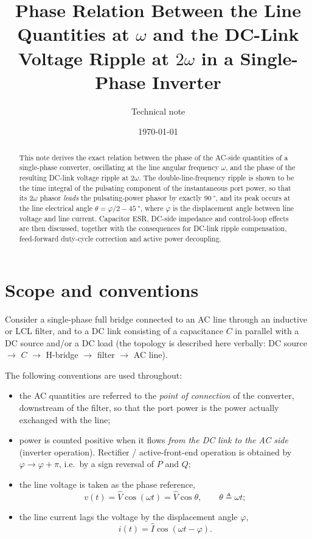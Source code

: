 \documentclass[11pt,a4paper]{article}
\title{Phase Relation Between the Line Quantities at $\omega$ and the
DC-Link Voltage Ripple at $2\omega$ in a Single-Phase Inverter}
\author{Technical note}
\date{\today}
\begin{document}
\maketitle

\begin{abstract}
This note derives the exact relation between the phase of the AC-side quantities
of a single-phase converter, oscillating at the line angular frequency $\omega$,
and the phase of the resulting DC-link voltage ripple at $2\omega$. The
double-line-frequency ripple is shown to be the time integral of the pulsating
component of the instantaneous port power, so that its $2\omega$ phasor
\emph{leads} the pulsating-power phasor by exactly $\SI{90}{\degree}$, and its
peak occurs at the line electrical angle $\theta = \varphi/2 - \SI{45}{\degree}$,
where $\varphi$ is the displacement angle between line voltage and line current.
Capacitor ESR, DC-side impedance and control-loop effects are then discussed,
together with the consequences for DC-link ripple compensation, feed-forward
duty-cycle correction and active power decoupling.
\end{abstract}

\section{Scope and conventions}

Consider a single-phase full bridge connected to an AC line through an inductive
or LCL filter, and to a DC link consisting of a capacitance $C$ in parallel with
a DC source and/or a DC load (the topology is described here verbally:
DC source $\rightarrow$ $C$ $\rightarrow$ H-bridge $\rightarrow$ filter
$\rightarrow$ AC line).

The following conventions are used throughout:

\begin{itemize}
  \item the AC quantities are referred to the \emph{point of connection} of the
        converter, downstream of the filter, so that the port power is the power
        actually exchanged with the line;
  \item power is counted positive when it flows \emph{from the DC link to the AC
        side} (inverter operation). Rectifier / active-front-end operation is
        obtained by $\varphi \rightarrow \varphi + \pi$, i.e.\ by a sign
        reversal of $P$ and $Q$;
  \item the line voltage is taken as the phase reference,
        \begin{equation}
          v(t) = \hat V \cos(\omega t) = \hat V \cos \theta ,
          \qquad \theta \triangleq \omega t ;
        \end{equation}
  \item the line current lags the voltage by the displacement angle $\varphi$,
        \begin{equation}
          i(t) = \hat I \cos(\omega t - \varphi) .
        \end{equation}
\end{itemize}
\end{document}
